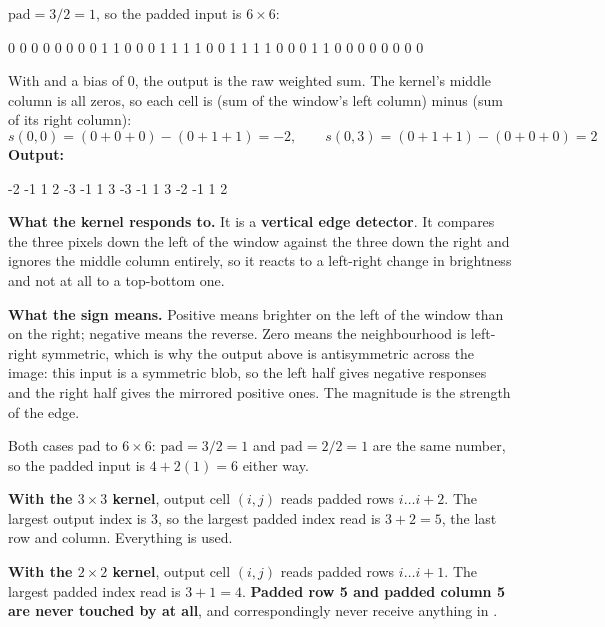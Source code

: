 
$\mathrm{pad} = 3 / 2 = 1$, so the padded input is $6 \times 6$:

\begin{console}
0 0 0 0 0 0
0 0 1 1 0 0
0 1 1 1 1 0
0 1 1 1 1 0
0 0 1 1 0 0
0 0 0 0 0 0
\end{console}

With  and a bias of 0, the output is the raw weighted sum. The kernel's middle
column is all zeros, so each cell is (sum of the window's left column) minus (sum of its right
column):
\[
  s(0,0) = (0 + 0 + 0) - (0 + 1 + 1) = -2, \qquad s(0,3) = (0 + 1 + 1) - (0 + 0 + 0) = 2
\]
\textbf{Output:}

\begin{console}
-2  -1   1   2
-3  -1   1   3
-3  -1   1   3
-2  -1   1   2
\end{console}

\textbf{What the kernel responds to.} It is a \textbf{vertical edge detector}. It compares the three
pixels down the left of the window against the three down the right and ignores the middle column
entirely, so it reacts to a left-right change in brightness and not at all to a top-bottom one.

\textbf{What the sign means.} Positive means brighter on the left of the window than on the right;
negative means the reverse. Zero means the neighbourhood is left-right symmetric, which is why the
output above is antisymmetric across the image: this input is a symmetric blob, so the left half
gives negative responses and the right half gives the mirrored positive ones. The magnitude is the
strength of the edge. 

Both cases pad to \textbf{$6 \times 6$}: $\mathrm{pad} = 3/2 = 1$ and $\mathrm{pad} = 2/2 = 1$ are
the same number, so the padded input is $4 + 2(1) = 6$ either way. 

\textbf{With the $3 \times 3$ kernel}, output cell $(i, j)$ reads padded rows $i \ldots i+2$. The
largest output index is 3, so the largest padded index read is $3 + 2 = 5$, the last row and
column. Everything is used.

\textbf{With the $2 \times 2$ kernel}, output cell $(i, j)$ reads padded rows $i \ldots i+1$. The
largest padded index read is $3 + 1 = 4$. \textbf{Padded row 5 and padded column 5 are never touched
by  at all}, and correspondingly never receive anything in
. 


